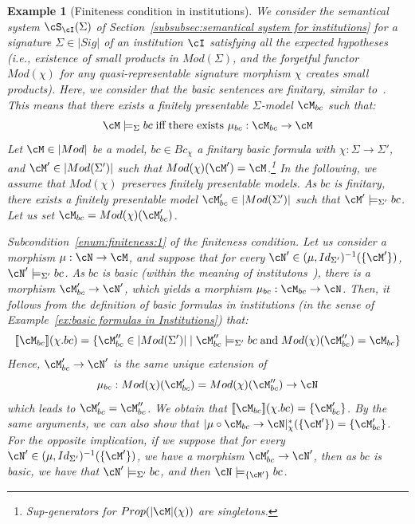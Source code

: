 \documentclass[preprint,3p,times]{elsarticle}
\newtheorem{example}[definition]{Example}
\def\sem#1{[\![ #1 ] \!]}
\begin{document}
\begin{example}[Finiteness condition in institutions]
We consider the semantical system $\cS_{\cI}(\Sigma)$ of Section~\ref{subsubsec:semantical system for institutions} for a signature $\Sigma \in |Sig|$ of an institution $\cI$ satisfying all the expected hypotheses (i.e., existence of small products in $Mod(\Sigma)$, and the forgetful functor $Mod(\chi)$ for any quasi-representable signature morphism $\chi$ creates small products). %
Here, we consider that the basic sentences are finitary, similar to~\cite{Dia08}. This means that there exists a finitely presentable $\Sigma$-model $\cM_{bc}$ such that:
\[\cM \models_\Sigma bc \; \mbox{iff} \; \mbox{there exists $\mu_{bc} : \cM_{bc} \to \cM$}\]
Let $\cM \in |Mod|$ be a model, $bc \in Bc_\chi$ a finitary basic formula with $\chi : \Sigma \to \Sigma'$, and $\cM' \in |Mod(\Sigma')|$ such that $Mod(\chi)(\cM') = \cM$.\footnote{Sup-generators for $Prop(|\cM|(\chi))$ are singletons.} In the following, we assume that $Mod(\chi)$ preserves finitely presentable models. As $bc$ is finitary, there exists a finitely presentable model $\cM'_{bc} \in |Mod(\Sigma')|$ such that $\cM' \models_{\Sigma'} bc$. \\ Let us set $\cM_{bc} = Mod(\chi)(\cM'_{bc})$.

\medskip
\emph{Subcondition~\ref{enum:finiteness:1} of the finiteness condition.}
Let us consider a morphism $\mu : \cN \to \cM$, and suppose that for every $\cN' \in (\mu,Id_{\Sigma'})^{-1}(\{\cM'\})$, $\cN' \models_{\Sigma'} bc$.
As $bc$ is basic (within the meaning of institutons~\cite{Dia08}), there is a morphism $\cM'_{bc} \to \cN'$, which yields a morphism $\mu_{bc} : \cM_{bc} \to \cN$.
Then, it follows from the definition of basic formulas in institutions (in the sense of Example~\ref{ex:basic formulas in Institutions}) that:
\[
\sem{\cM_{bc}}(\chi.bc) = \{\cM''_{bc} \in |Mod(\Sigma')| \mid \cM''_{bc} \models_{\Sigma'} bc \; \mbox{and} \; Mod(\chi)(\cM''_{bc}) = \cM_{bc}\}
\]
Hence, $\cM'_{bc} \to \cN'$ is the same unique extension of 
\[
\mu_{bc} : Mod(\chi)(\cM'_{bc}) = Mod(\chi)(\cM''_{bc}) \to \cN
\]
which leads to $\cM'_{bc} = \cM''_{bc}$.
We obtain that $\sem{\cM_{bc}}(\chi.bc) = \{\cM'_{bc}\}$. By the same arguments, we can also show that $|\mu \circ \cM_{bc} \to \cN|^*_\chi(\{\cM'\}) = \{\cM'_{bc}\}$.\\
For the opposite implication, if we suppose that for every $\cN' \in (\mu,Id_{\Sigma'})^{-1}(\{\cM'\})$, we have a morphism $\cM'_{bc} \to \cN'$, then as $bc$ is basic, we have that $\cN' \models _{\Sigma'} bc$, and then $\cN \models_{\{\cM'\}} bc$.


\end{example}
\end{document}
